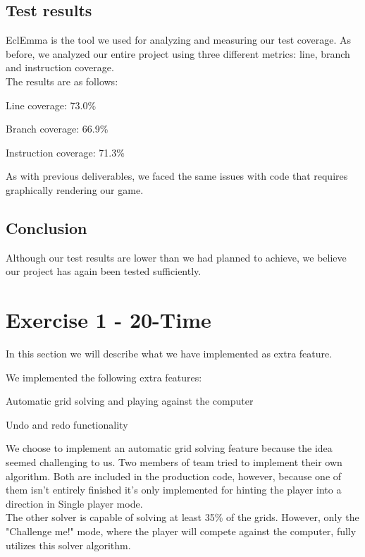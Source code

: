 \documentclass[a4paper,11pt,report]{scrartcl}
\begin{document}
\subsection{Test results}
EclEmma is the tool we used for analyzing and measuring our test coverage.
As before, we analyzed our entire project using three different metrics: line,
branch and instruction coverage.\\

The results are as follows:
\begin{description}
	\item Line coverage: 73.0\%
	\item Branch coverage: 66.9\%
	\item Instruction coverage: 71.3\%
\end{description}
As with previous deliverables, we faced the same issues with code that requires
graphically rendering our game. 

\subsection{Conclusion}
Although our test results are lower than we had planned to achieve, we believe
our project has again been tested sufficiently.

\newpage\section{Exercise 1 - 20-Time}
In this section we will describe what we have implemented as extra feature.

We implemented the following extra features:
\begin{description}
	\item Automatic grid solving and playing against the computer
	\item Undo and redo functionality
\end{description}

We choose to implement an automatic grid solving feature because the idea seemed challenging to us. Two members of team tried to implement their own algorithm. Both are included in the production code, however, because one of them isn't entirely finished it's only implemented for hinting the player into a direction in Single player mode.\\
The other solver is capable of solving at least 35\% of the grids. However, only the "Challenge me!" mode, where the player will compete against the computer, fully utilizes this solver algorithm.\\
\end{document}

